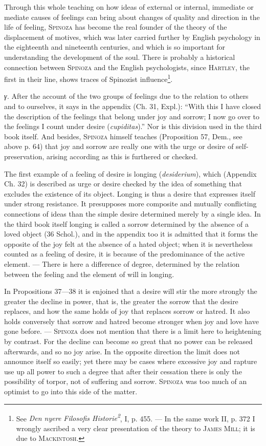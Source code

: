 \documentclass[12pt]{article}
\newcommand{\opage}[1]{\marginnote{\footnotesize\textit{[#1]}}}
\begin{document}
Through this whole teaching on how ideas of external or internal, immediate or mediate causes of
feelings can bring about changes of quality and direction in the life of feeling, \textsc{Spinoza}
has become the real founder of the theory of the displacement of motives, which was later carried
further by English psychology in the eighteenth and nineteenth centuries, and which is so important
for understanding the development of the soul. There is probably a historical connection between
\textsc{Spinoza} and the English psychologists, since \textsc{Hartley}, the first in their line,
shows traces of Spinozist influence\footnote{See \textit{Den nyere Filosofis
Historie\textsuperscript{2}}, I, p. 455. --- In the same work II, p. 372 I wrongly ascribed a very
clear presentation of the theory to \textsc{James Mill}; it is due to \textsc{Mackintosh}.}.

\textit{γ.} After the account of the two groups of feelings due to the relation to others and to
ourselves, it says in the appendix (Ch. 31, Expl.): ``With this I have closed the description of
the feelings that belong under joy and sorrow; I now go over to the feelings I count under desire
(\textit{cupiditas}).'' Nor is this division used in the third book itself. And besides,
\textsc{Spinoza} himself teaches (Proposition 57, Dem., see above p. 64) that joy and sorrow are
really one with the urge or desire of self-preservation, arising according as this is furthered
or checked.

The first example of a feeling of desire is longing (\textit{desiderium}), which (Appendix Ch. 32)
\opage{67}is described as urge or desire checked by the idea of something that excludes the
existence of its object. Longing is thus a desire that expresses itself under strong resistance. It
presupposes more composite and mutually conflicting connections of ideas than the simple desire
determined merely by a single idea. In the third book itself longing is called a sorrow determined
by the absence of a loved object (36 Schol.), and in the appendix too it is admitted that it forms
the opposite of the joy felt at the absence of a hated object; when it is nevertheless counted as
a feeling of desire, it is because of the predominance of the active element. --- There is here a
difference of degree, determined by the relation between the feeling and the element of will in
longing.

In Propositions 37---38 it is enjoined that a desire will stir the more strongly the greater the
decline in power, that is, the greater the sorrow that the desire replaces, and how the same holds
of joy that replaces sorrow or hatred. It also holds conversely that sorrow and hatred become
stronger when joy and love have gone before. --- \textsc{Spinoza} does not mention that there is a
limit here to heightening by contrast. For the decline can become so great that no power can be
released afterwards, and so no joy arise. In the opposite direction the limit does not announce
itself so easily; yet there may be cases where excessive joy and rapture use up all power to such a
degree that after their cessation there is only the possibility of torpor, not of suffering and
sorrow. \textsc{Spinoza} was too much of an optimist to go into this side of the matter.
\end{document}
